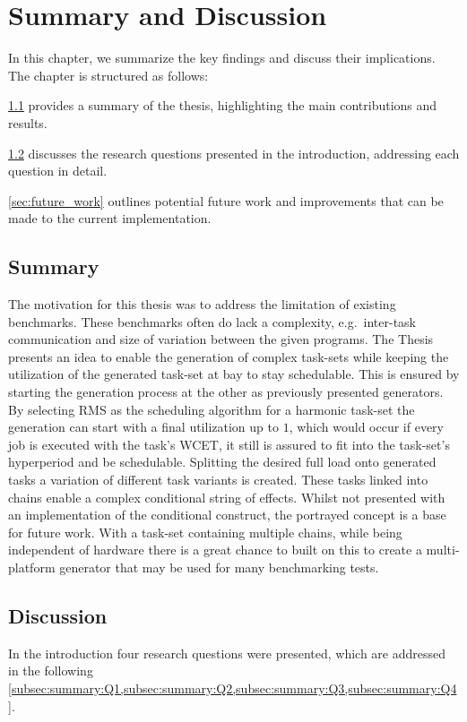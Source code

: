 \chapter{Summary and Discussion}\label{ch:summary_discussion}
In this chapter, we summarize the key findings and discuss their implications. The chapter is structured as follows:

\cref{sec:summary} provides a summary of the thesis, highlighting the main contributions and results.

\cref{sec:discussion} discusses the research questions presented in the introduction, addressing each question in detail.

\cref{sec:future_work} outlines potential future work and improvements that can be made to the current implementation.

\section{Summary}\label{sec:summary}
The motivation for this thesis was to address the limitation of existing benchmarks.
These benchmarks often do lack a complexity, e.g.~inter-task communication and size of variation between the given programs.
The Thesis presents an idea to enable the generation of complex task-sets while keeping the utilization of the generated task-set at bay to stay schedulable.
This is ensured by starting the generation process at the other as previously presented generators.
By selecting \ac{RMS} as the scheduling algorithm for a harmonic task-set the generation can start with a final utilization up to $1$, which would occur if every job is executed with the task's \ac{WCET}, it still is assured to fit into the task-set's hyperperiod and be schedulable.
Splitting the desired full load onto generated tasks a variation of different task variants is created.
These tasks linked into chains enable a complex conditional string of effects.
Whilst not presented with an implementation of the conditional construct, the portrayed concept is a base for future work.
With a task-set containing multiple chains, while being independent of hardware there is a great chance to built on this to create a multi-platform generator that may be used for many benchmarking tests.

\section{Discussion}\label{sec:discussion}
In the introduction four research questions were presented, which are addressed in the following \cref{subsec:summary:Q1,subsec:summary:Q2,subsec:summary:Q3,subsec:summary:Q4}.

